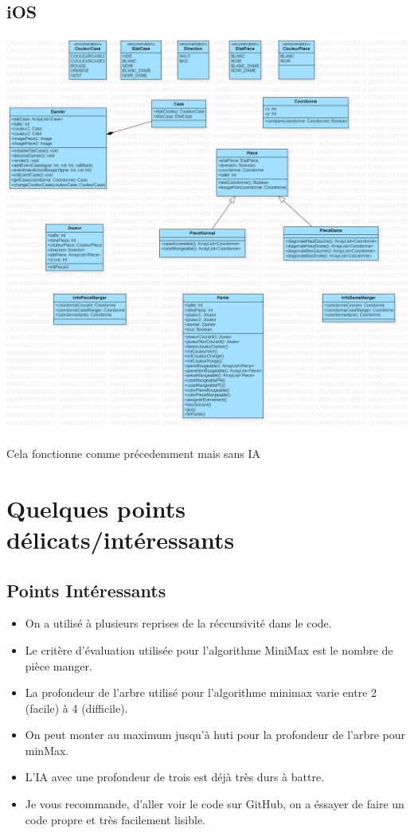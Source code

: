 \documentclass{article}
\begin{document}
\subsection{iOS} %

\begin{center}
  \includegraphics[scale=0.26]{diagramme_iospng.png}
\end{center}

Cela fonctionne comme précedemment mais sans IA


\section{Quelques points délicats/intéressants}

\subsection{Points Intéressants}

\begin{itemize}
  \item On a utilisé à plusieurs reprises de la réccursivité dans le code.
  \item Le critère d'évaluation utilisée pour l'algorithme MiniMax est le nombre de pièce manger.
  \item La profondeur de l'arbre utilisé pour l'algorithme minimax varie entre 2 (facile) à 4 (difficile).
  \item On peut monter au maximum jusqu'à huti pour la profondeur de l'arbre pour minMax.
  \item L'IA avec une profondeur de trois est déjà très durs à battre.
  \item Je vous recommande, d'aller voir le code sur GitHub, 
  on a éssayer de faire un code propre et très facilement lisible.
\end{itemize}
\end{document}
